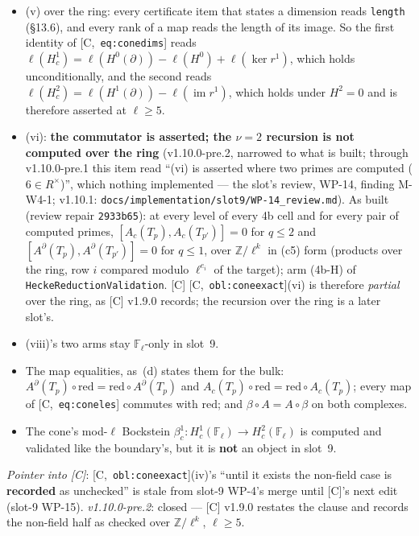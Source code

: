 \documentclass[11pt]{article}
\theoremstyle{remark}
\newcommand{\F}{\mathbb{F}}
\newcommand{\Z}{\mathbb{Z}}
\newcommand{\Fl}{\F_\ell}
\newcommand{\HA}[1]{[C,~\texttt{#1}]}      %
\begin{document}
\begin{itemize}
\begin{itemize}
    false-alarm), and a wrong stored image length fails item~11.
  \item (v) over the ring: every certificate item that states a dimension reads
    \texttt{length} (\S13.6), and every rank of a map reads the length of its image. So the first
    identity of \HA{eq:conedims} reads
    $\ell(H^1_c)=\ell(H^0(\partial))-\ell(H^0)+\ell(\ker r^1)$, which holds unconditionally, and the
    second reads $\ell(H^2_c)=\ell(H^1(\partial))-\ell(\operatorname{im}r^1)$, which holds under
    $H^2=0$ and is therefore asserted at $\ell\ge5$.
  \item (vi): \textbf{the commutator is asserted; the $\nu=2$ recursion is not computed over the
    ring} (v1.10.0-pre.2, narrowed to what is built; through v1.10.0-pre.1 this item read
    ``(vi) is asserted where two primes are computed ($6\in R^{\times}$)'', which nothing
    implemented --- the slot's review, WP-14, finding M-W4-1; v1.10.1: \texttt{docs/implementation/slot9/WP-14\_review.md}). As built (review repair
    \texttt{2933b65}): at every level of every 4b cell and for every pair of computed primes,
    $[A_c(T_p),A_c(T_{p'})]=0$ for $q\le2$ and $[A^{\partial}(T_p),A^{\partial}(T_{p'})]=0$ for
    $q\le1$, over $\Z/\ell^k$ in (c5) form (products over the ring, row $i$ compared modulo
    $\ell^{e_i}$ of the target); arm (4b-H) of \texttt{HeckeReductionValidation}. [C]
    \HA{obl:coneexact}(vi) is therefore \emph{partial} over the ring, as [C] v1.9.0 records; the
    recursion over the ring is a later slot's.
  \item (viii)'s two arms stay $\Fl$-only in slot~9.
  \item The map equalities, as~(d) states them for the bulk:
    $A^{\partial}(T_p)\circ\mathrm{red}=\mathrm{red}\circ A^{\partial}(T_p)$ and
    $A_c(T_p)\circ\mathrm{red}=\mathrm{red}\circ A_c(T_p)$; every map of \HA{eq:coneles} commutes
    with $\mathrm{red}$; and $\beta\circ A=A\circ\beta$ on both complexes.
  \item The cone's mod-$\ell$ Bockstein $\beta^1_c\colon H^1_c(\Fl)\to H^2_c(\Fl)$ is computed and
    validated like the boundary's, but it is \textbf{not} an object in slot~9.
  \end{itemize}
  \emph{Pointer into [C]}: \HA{obl:coneexact}(iv)'s ``until it exists the non-field case is
  \textbf{recorded} as unchecked'' is stale from slot-9 WP-4's merge until [C]'s next edit
  (slot-9 WP-15). \emph{v1.10.0-pre.2}: closed --- [C] v1.9.0 restates the clause and records the
  non-field half as checked over $\Z/\ell^k$, $\ell\ge5$.

\end{itemize}
\end{document}
